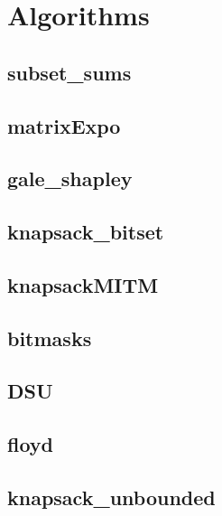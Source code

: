 \section{Algorithms}
\subsection{subset_sums}
\raggedbottom
\hrulefill
\subsection{matrixExpo}
\raggedbottom
\hrulefill
\subsection{gale_shapley}
\raggedbottom
\hrulefill
\subsection{knapsack_bitset}
\raggedbottom
\hrulefill
\subsection{knapsackMITM}
\raggedbottom
\hrulefill
\subsection{bitmasks}
\raggedbottom
\hrulefill
\subsection{DSU}
\raggedbottom
\hrulefill
\subsection{floyd}
\raggedbottom
\hrulefill
\subsection{knapsack_unbounded}
\raggedbottom
\hrulefill

